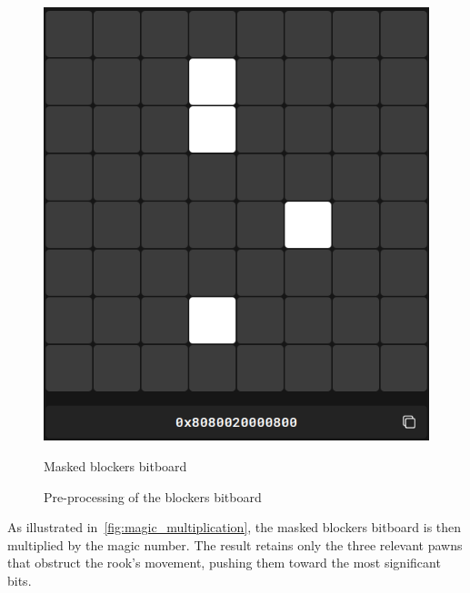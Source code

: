 \begin{figure}
\begin{minipage}[c]{0.4\textwidth}
        \includegraphics[width=\textwidth]{Imagenes/magics_processed_blockers.png}
        \caption{Masked blockers bitboard}
    \end{minipage}
    \caption{Pre-processing of the blockers bitboard}\label{fig:magic_preprocessing}
\end{figure}

\noindent As illustrated in~\cref{fig:magic_multiplication}, the masked blockers bitboard is then multiplied by the magic number. The result retains only the three relevant pawns that obstruct the rook's movement, pushing them toward the most significant bits.

\vspace{1em}

